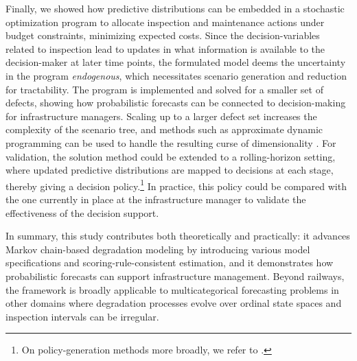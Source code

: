 Finally, we showed how predictive distributions can be embedded in a stochastic optimization program to allocate inspection and maintenance actions under budget constraints, minimizing expected costs. 
Since the decision-variables related to inspection lead to updates in what information is available to the decision-maker at later time points, the formulated model deems the uncertainty in the program \textit{endogenous}, which necessitates scenario generation and reduction for tractability.
The program is implemented and solved for a smaller set of defects, showing how probabilistic forecasts can be connected to decision-making for infrastructure managers. Scaling up to a larger defect set increases the complexity of the scenario tree, and methods such as approximate dynamic programming can be used to handle the resulting curse of dimensionality \citep{powell2016a}. For validation, the solution method could be extended to a rolling-horizon setting, where updated predictive distributions are mapped to decisions at each stage, thereby giving a decision policy.\footnote{On policy-generation methods more broadly, we refer to \citet{powell2018a}.} In practice, this policy could be compared with the one currently in place at the infrastructure manager to validate the effectiveness of the decision support.

In summary, this study contributes both theoretically and practically: it advances Markov chain-based degradation modeling by introducing various model specifications and scoring-rule-consistent estimation, and it demonstrates how probabilistic forecasts can support infrastructure management. Beyond railways, the framework is broadly applicable to multicategorical forecasting problems in other domains where degradation processes evolve over ordinal state spaces and inspection intervals can be irregular.

